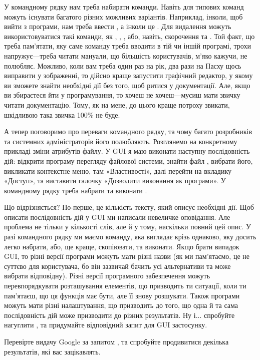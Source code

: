 У командному рядку нам треба набирати команди.
Навіть для типових команд можуть існувати багатого різних можливих варіантів.
Наприклад, інколи, щоб вийти з програми, нам треба ввести , а інколи це .
Для видалення можуть використовуватися такі команди, як , , , або, навіть, скорочення  та .
Той факт, що треба пам'ятати, яку саме команду треба вводити в тій чи іншій програмі, трохи напружує---треба читати мануали, що більшість користувачів, м'яко кажучи, не полюбляє.
Можливо, коли вам треба один раз на рік, два рази на Пасху щось виправити у зображенні, то дійсно краще запустити графічний редактор, у якому ви зможете знайти необхідні дії без того, щоб ритися у документації.
Але, якщо ви збираєтеся йти у програмування, то хочеш не хочеш---мусиш мати звичку читати документацію.
Тому, як на мене, до цього краще потроху звикати, шкідливою така звичка 100\% не буде.

А тепер поговоримо про переваги командного рядку, та чому багато розробників та системних адміністраторів його полюбляють.
Розглянемо на конкретному прикладі зміни атрибутів файлу.
У GUI я маю виконати наступну послідовність дій: відкрити програму перегляду файлової системи, знайти файл , вибрати його, викликати контекстне меню, там «Властивості», далі перейти на вкладику «Доступ», та виставити галочку «Дозволити виконання як програми».
У командному рядку треба набрати та виконати .

Що відрізняється?
По-перше, це кількість тексту, який описує необхідні дії.
Щоб описати послідовність дій у GUI ми написали невеличке оповідання.
Але проблема не тільки у кількості слів, але й у тому, наскільки повний цей опис.
У разі командного рядку ми маємо команду, яка виглядає крізь однаково, яку досить легко набрати, або, ще краще, скопіювати, та виконати.
Якщо брати випадок GUI, то різні версії програми можуть мати різні назви (як ми пам'ятаємо, це не суттєво для користувача, бо він зазвичай бачить усі альтернативи та може вибрати відповідну).
Різні версії програмного забезпечення можуть перевпорядкувати розташування елементів, що призводить ти ситуації, коли ти пам'ятаєш, що ця функція має бути, але її знову розшукати.
Також програми можуть мати різні налаштування, що призводить до того, що одна й та сама послідовність дій може призводити до різних результатів.
Ну і... спробуйте нагуглити , та придумайте відповідний запит для GUI застосунку.

\begin{exercise}
Перевірте видачу Google за запитом , та спробуйте продивитися декілька результатів, які вас зацікавлять.
\end{exercise}

